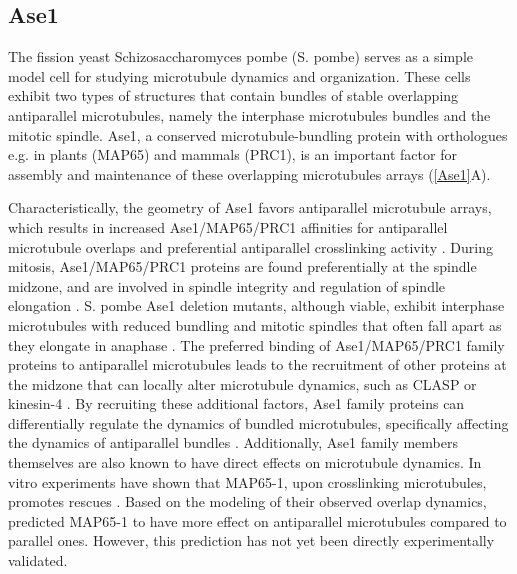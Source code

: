 \subsection{Ase1}
\label{sec:Ase1_intro}
The fission yeast Schizosaccharomyces pombe (S. pombe) serves as a simple model cell for studying microtubule dynamics and organization. These cells exhibit two types of structures that contain bundles of stable overlapping antiparallel microtubules, namely the interphase microtubules bundles and the mitotic spindle. Ase1, a conserved microtubule-bundling protein with orthologues e.g. in plants (MAP65) and mammals (PRC1), is an important factor for assembly and maintenance of these overlapping microtubules arrays \parencite{Loiodice2005,Yamashita2005} (\autoref{Ase1}A).\par
Characteristically, the geometry of Ase1 favors antiparallel microtubule arrays, which results in increased Ase1/MAP65/PRC1 affinities for antiparallel microtubule overlaps and preferential antiparallel crosslinking activity \parencite{She2019,Bieling2010,Janson2007,Subramanian2010,Kellogg2016,Gaillard2008}. During mitosis, Ase1/MAP65/PRC1 proteins are found preferentially at the spindle midzone, and are involved in spindle integrity and regulation of spindle elongation \parencite{Loiodice2005,Yamashita2005,She2019}. S. pombe Ase1 deletion mutants, although viable, exhibit interphase microtubules with reduced bundling and mitotic spindles that often fall apart as they elongate in anaphase \parencite{Loiodice2005,Yamashita2005}. The preferred binding of Ase1/MAP65/PRC1 family proteins to antiparallel microtubules leads to the recruitment of other proteins at the midzone that can locally alter microtubule dynamics, such as CLASP \parencite{Bratman2007b,Liu2009,Kitazawa2014} or kinesin-4 \parencite{Bieling2010, Mani2021}. By recruiting these additional factors, Ase1 family proteins can differentially regulate the dynamics of bundled microtubules, specifically affecting the dynamics of antiparallel bundles \parencite{Bieling2010,Bratman2007b, Mani2021}. Additionally, Ase1 family members themselves are also known to have direct effects on microtubule dynamics. In vitro experiments have shown that MAP65-1, upon crosslinking microtubules, promotes rescues \parencite{Stoppin-Mellet2013}. Based on the modeling of their observed overlap dynamics, \cite{Stoppin-Mellet2013} predicted MAP65-1 to have more effect on antiparallel microtubules compared to parallel ones. However, this prediction has not yet been directly experimentally validated.\par
